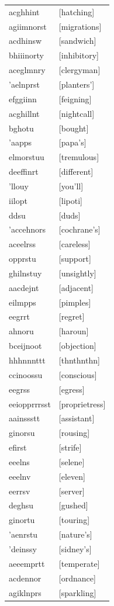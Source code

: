 \documentclass{article}
\begin{document}
\begin{tabular}{ll}
acghhint & [hatching] \\
agiimnorst & [migrations] \\
acdhinsw & [sandwich] \\
bhiiinorty & [inhibitory] \\
aceglmnry & [clergyman] \\
'aelnprst & [planters'] \\
efggiinn & [feigning] \\
acghillnt & [nightcall] \\
bghotu & [bought] \\
'aapps & [papa's] \\
elmorstuu & [tremulous] \\
deeffinrt & [different] \\
'llouy & [you'll] \\
iilopt & [lipoti] \\
ddsu & [duds] \\
'accehnors & [cochrane's] \\
aceelrss & [careless] \\
opprstu & [support] \\
ghilnstuy & [unsightly] \\
aacdejnt & [adjacent] \\
eilmpps & [pimples] \\
eegrrt & [regret] \\
ahnoru & [haroun] \\
bceijnoot & [objection] \\
hhhnnnttt & [thnthnthn] \\
ccinoossu & [conscious] \\
eegrss & [egress] \\
eeiopprrrsst & [proprietress] \\
aainssstt & [assistant] \\
ginorsu & [rousing] \\
efirst & [strife] \\
eeelns & [selene] \\
eeelnv & [eleven] \\
eerrsv & [server] \\
deghsu & [gushed] \\
ginortu & [touring] \\
'aenrstu & [nature's] \\
'deinssy & [sidney's] \\
aeeemprtt & [temperate] \\
acdennor & [ordnance] \\
agiklnprs & [sparkling] \\

\end{tabular}
\end{document}
